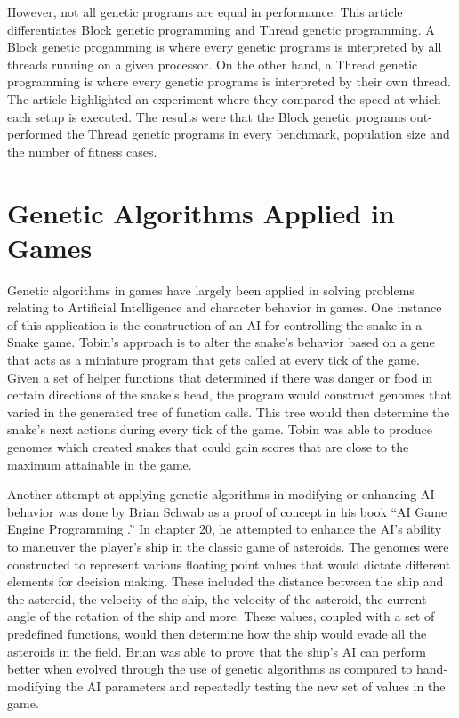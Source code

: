 However, not all genetic programs are equal in performance. This article  differentiates
Block genetic programming and Thread genetic programming\cite{Robbilliard09}. A Block
genetic progamming is where every genetic programs is interpreted by all threads running
on a given processor. On the other hand, a Thread genetic programming is where every genetic
programs is interpreted by their own thread. The article highlighted an experiment where they
compared the speed at which each setup is executed. The results were that the Block genetic
programs out-performed the Thread genetic programs in every benchmark, population size and
the number of fitness cases.

\section{Genetic Algorithms Applied in Games}

Genetic algorithms in games have largely been applied in solving problems relating to
Artificial Intelligence and character behavior in games. One instance of this application
is the construction of an AI for controlling the snake in a Snake game\cite{Ehlis00}.
Tobin's approach is to alter the snake's behavior based on a gene that acts as a miniature
program that gets called at every tick of the game. Given a set of helper functions that
determined if there was danger or food in certain directions of the snake's head, the
program would construct genomes that varied in the generated tree of function calls. This
tree would then determine the snake's next actions during every tick of the game. Tobin
was able to produce genomes which created snakes that could gain scores that are close to
the maximum attainable in the game.  

Another attempt at applying genetic algorithms in modifying or enhancing AI behavior was
done by Brian Schwab as a proof of concept in his book ``AI Game Engine Programming
\cite{Schwab04}.'' In chapter 20, he attempted to enhance the AI's ability to maneuver
the player's ship in the classic game of asteroids. The genomes were constructed to represent
various floating point values that would dictate different elements for decision making.
These included the distance between the ship and the asteroid, the velocity of the ship, the
velocity of the asteroid, the current angle of the rotation of the ship and more. These
values, coupled with a set of predefined functions, would then determine how the ship would
evade all the asteroids in the field. Brian was able to prove that the ship's AI can perform
better when evolved through the use of genetic algorithms as compared to hand-modifying the
AI parameters and repeatedly testing the new set of values in the game.

